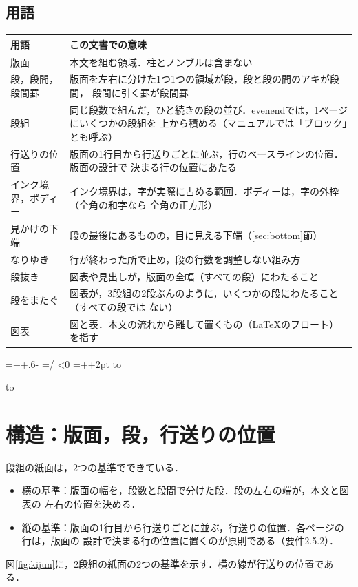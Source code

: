 \documentclass[twocolumn,paper=a4,fontsize=10pt]{jlreq}
\newcommand\sandan{\evenendcolumns[columnsep=1\zw]{3}}
\newcommand\ichidan{\evenendcolumns{1}}
\newenvironment{gyouhako}{\par
  \begin{lrbox}{\gyouhakobox}\begin{minipage}{\linewidth}}
  {\end{minipage}\end{lrbox}%
  \dimen0=\dimexpr\ht\gyouhakobox+\dp\gyouhakobox+.6\baselineskip-\topskip-2pt\relax
  \gyoulines=\numexpr\dimen0/\baselineskip\relax
  \ifdim\dimexpr\baselineskip*\gyoulines\relax<\dimen0 \advance\gyoulines 1 \fi
  \ifnum\gyoulines<0 \gyoulines=0 \fi
  \dimen2=\dimexpr\topskip+\baselineskip*\gyoulines+2pt\relax
  \noindent\vbox to\topskip{\vbox to\dimen2{\vss\box\gyouhakobox\vss}\vss}\par
  \nobreak\nointerlineskip\vbox to\gyoulines\baselineskip{}}
\newenvironment{hyou}{\begin{gyouhako}\centering\small}{\end{gyouhako}}
\begin{document}
\ichidan
\subsection{用語}

\begin{hyou}
  \begin{tabular}{P{.2\linewidth}P{.7\linewidth}}
    \hline
    用語 & この文書での意味 \\
    \hline
    版面 & 本文を組む領域．柱とノンブルは含まない \\
    段，段間，段間罫 & 版面を左右に分けた1つ1つの領域が段，段と段の間のアキが段間，
      段間に引く罫が段間罫 \\
    段組 & 同じ段数で組んだ，ひと続きの段の並び．evenendでは，1ページにいくつかの段組を
      上から積める（マニュアルでは「ブロック」とも呼ぶ） \\
    行送りの位置 & 版面の1行目から行送りごとに並ぶ，行のベースラインの位置．版面の設計で
      決まる行の位置にあたる \\
    インク境界，ボディー & インク境界は，字が実際に占める範囲．ボディーは，字の外枠（全角の和字なら
      全角の正方形） \\
    見かけの下端 & 段の最後にあるものの，目に見える下端（\ref{sec:bottom}節） \\
    なりゆき & 行が終わった所で止め，段の行数を調整しない組み方 \\
    段抜き & 図表や見出しが，版面の全幅（すべての段）にわたること \\
    段をまたぐ & 図表が，3段組の2段ぶんのように，いくつかの段にわたること（すべての段では
      ない） \\
    図表 & 図と表．本文の流れから離して置くもの（\LaTeX{}のフロート）を指す \\
    \hline
  \end{tabular}
\end{hyou}

\sandan
\section{構造：版面，段，行送りの位置}\label{sec:structure}

段組の紙面は，2つの基準でできている．
\begin{itemize}
  \item 横の基準：版面の幅を，段数と段間で分けた段．段の左右の端が，本文と図表の
    左右の位置を決める．
  \item 縦の基準：版面の1行目から行送りごとに並ぶ，行送りの位置．各ページの行は，版面の
    設計で決まる行の位置に置くのが原則である（要件2.5.2）．
\end{itemize}
図\ref{fig:kijun}に，2段組の紙面の2つの基準を示す．横の線が行送りの位置である．
\end{document}
